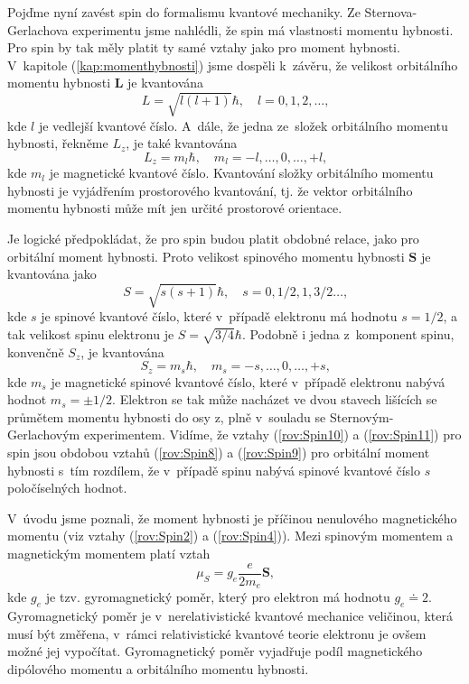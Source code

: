 Pojďme nyní zavést spin do formalismu kvantové mechaniky. Ze Sternova-Gerlachova experimentu jsme nahlédli, že spin má vlastnosti momentu hybnosti. Pro spin by tak měly platit ty samé vztahy jako pro moment hybnosti. V~kapitole (\ref{kap:momenthybnosti}) jsme dospěli k~závěru, že velikost orbitálního momentu hybnosti $\mathbf{L}$ je kvantována 
\begin{equation}
L = \sqrt{l(l+1)}\hbar, \quad l=0,1,2,\dots \mbox{,}
\label{rov:Spin8}
\end{equation}
kde $l$ je vedlejší kvantové číslo. A~dále, že jedna ze~složek orbitálního momentu hybnosti, řekněme $L_z$, je také kvantována
\begin{equation}
L_z = m_l \hbar, \quad m_l=-l,\dots, 0, \dots, +l \mbox{,}
\label{rov:Spin9}
\end{equation}
kde $m_l$ je magnetické kvantové číslo. Kvantování složky orbitálního momentu hybnosti je vyjádřením prostorového kvantování, tj. že vektor orbitálního momentu hybnosti může mít jen určité prostorové orientace.

Je logické předpokládat, že pro spin budou platit obdobné relace, jako pro orbitální moment hybnosti. Proto velikost spinového momentu hybnosti $\mathbf{S}$ je kvantována jako
\begin{equation}
S = \sqrt{s(s+1)}\hbar, \quad s=0,1/2,1,3/2 \dots \mbox{,}
\label{rov:Spin10}
\end{equation}
kde $s$ je spinové kvantové číslo, které v~případě elektronu má hodnotu $s=1/2$, a tak velikost spinu elektronu je $S = \sqrt{3/4}\hbar$. Podobně i jedna z~komponent spinu, konvenčně $S_z$, je kvantována
\begin{equation}
S_z = m_s \hbar, \quad m_s= -s, \dots, 0, \dots, +s \mbox{,}
\label{rov:Spin11}
\end{equation}
kde $m_s$ je magnetické spinové kvantové číslo, které v~případě elektronu nabývá hodnot $m_s=\pm 1/2$. Elektron se tak může nacházet ve dvou stavech lišících se průmětem momentu hybnosti do osy z, plně v~souladu se Sternovým-Gerlachovým experimentem. Vidíme, že vztahy (\ref{rov:Spin10}) a (\ref{rov:Spin11}) pro spin jsou obdobou vztahů (\ref{rov:Spin8}) a (\ref{rov:Spin9}) pro orbitální moment hybnosti s~tím rozdílem, že v~případě spinu nabývá spinové kvantové číslo $s$ poločíselných hodnot. 

V~úvodu jsme poznali, že moment hybnosti je příčinou nenulového magnetického momentu (viz vztahy (\ref{rov:Spin2}) a (\ref{rov:Spin4})). Mezi spinovým momentem a magnetickým momentem platí vztah
\begin{equation}
\mu_S = g_e \frac{e}{2m_e}\mathbf{S} \mbox{,}
\label{rov:Spin12}
\end{equation}
kde $g_e$ je tzv. gyromagnetický poměr, který pro elektron má hodnotu $g_e\doteq2$. Gyromagnetický poměr je v~nerelativistické kvantové mechanice veličinou, která musí být změřena, v~rámci relativistické kvantové teorie elektronu je ovšem možné jej vypočítat. Gyromagnetický poměr vyjadřuje podíl magnetického dipólového momentu a orbitálního momentu hybnosti.

